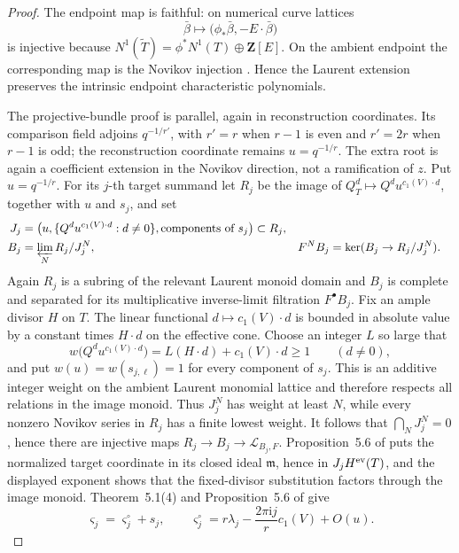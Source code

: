 \begin{proof}
The endpoint map is faithful: on numerical curve lattices
\[
 \bar\beta\longmapsto
 \bigl(\phi_*\bar\beta,-E\cdot\bar\beta\bigr)
\]
is injective because
\(N^1(\widetilde T)=\phi^*N^1(T)\oplus\mathbf Z[E]\).  On the ambient
endpoint the corresponding map is the Novikov injection
\cite[(1.1)]{IritaniKoto}.  Hence the Laurent
extension preserves the intrinsic endpoint characteristic polynomials.

The projective-bundle proof is parallel, again in reconstruction coordinates.
Its comparison field adjoins \(q^{-1/r'}\), with \(r'=r\) when \(r-1\) is
even and \(r'=2r\) when \(r-1\) is odd; the reconstruction coordinate remains
\(u=q^{-1/r}\).  The extra root is again a coefficient extension in the
Novikov direction, not a ramification of \(z\).
Put \(u=q^{-1/r}\).  For its \(j\)-th target summand let \(R_j\) be the image
of \(Q_T^d\mapsto Q^d u^{c_1(V)\cdot d}\), together with \(u\) and \(s_j\),
and set
\[
 \begin{aligned}
 J_j&=\bigl(u,\{Q^d u^{c_1(V)\cdot d}:d\ne0\},
             \text{components of }s_j\bigr)\subset R_j,\\
 B_j&=\varprojlim_N R_j/J_j^N,
 &F^NB_j&=\ker(B_j\to R_j/J_j^N).
 \end{aligned}
\]
Again \(R_j\) is a subring of the relevant Laurent monoid domain and \(B_j\)
is complete and separated for its multiplicative inverse-limit filtration
\(F^\bullet B_j\).  Fix an ample divisor \(H\) on \(T\).  The linear
functional \(d\mapsto c_1(V)\cdot d\) is bounded in absolute value by a
constant times \(H\cdot d\) on the effective cone.  Choose an integer \(L\)
so large that
\[
 w\bigl(Q^d u^{c_1(V)\cdot d}\bigr)
   =L(H\cdot d)+c_1(V)\cdot d\ge1
 \qquad(d\ne0),
\]
and put \(w(u)=w(s_{j,\ell})=1\) for every component of \(s_j\).  This is an
additive integer weight on the ambient Laurent monomial lattice and therefore
respects all relations in the image monoid.  Thus \(J_j^N\) has weight at
least \(N\), while every nonzero Novikov series in \(R_j\) has a finite
lowest weight.  It follows that \(\bigcap_NJ_j^N=0\), hence there are
injective maps
\(R_j\to B_j\to\mathscr L_{B_j,F}\).
Proposition~5.6 of \cite{IritaniKoto} puts the normalized target coordinate in
its closed ideal \(\mathfrak m\), hence in \(J_jH^{\rm ev}(T)\), and the
displayed exponent shows that the fixed-divisor substitution factors through
the image monoid.
Theorem~5.1(4) and Proposition~5.6 of \cite{IritaniKoto} give
\[
 \varsigma_j=\varsigma_j^\circ+s_j,
 \qquad
 \varsigma_j^\circ=r\lambda_j-\frac{2\pi\mathrm{i}j}{r}c_1(V)+O(u).
\]

\end{proof}

